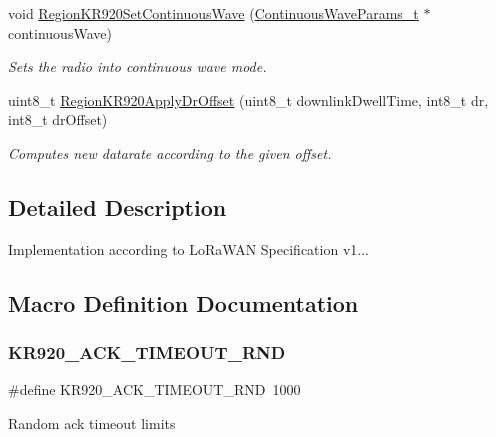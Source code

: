 \begin{DoxyCompactItemize}
void \hyperlink{group__REGIONKR920_gaaa9c13bab01bbfc0445b49587c59b8e7}{Region\+K\+R920\+Set\+Continuous\+Wave} (\hyperlink{group__REGION_gaf39bb5ba06921139c6d17f88a8d518cd}{Continuous\+Wave\+Params\+\_\+t} $\ast$continuous\+Wave)
\begin{DoxyCompactList}\small\item\em Sets the radio into continuous wave mode. \end{DoxyCompactList}\item 
uint8\+\_\+t \hyperlink{group__REGIONKR920_ga7a581cc43a0d722cc553966d021df020}{Region\+K\+R920\+Apply\+Dr\+Offset} (uint8\+\_\+t downlink\+Dwell\+Time, int8\+\_\+t dr, int8\+\_\+t dr\+Offset)
\begin{DoxyCompactList}\small\item\em Computes new datarate according to the given offset. \end{DoxyCompactList}\end{DoxyCompactItemize}


\subsection{Detailed Description}
Implementation according to Lo\+Ra\+W\+AN Specification v1... 

\subsection{Macro Definition Documentation}
\mbox{\label{group__REGIONKR920_ga26ae76d76a56899ec2fd39c9c77b601b}} 
\subsubsection{\texorpdfstring{K\+R920\+\_\+\+A\+C\+K\+\_\+\+T\+I\+M\+E\+O\+U\+T\+\_\+\+R\+ND}{KR920\_ACK\_TIMEOUT\_RND}}
{\footnotesize\ttfamily \#define K\+R920\+\_\+\+A\+C\+K\+\_\+\+T\+I\+M\+E\+O\+U\+T\+\_\+\+R\+ND~1000}

Random ack timeout limits \mbox{\label{group__REGIONKR920_ga274fcbad0638c07b7ee17dabaa76ea43}} 
